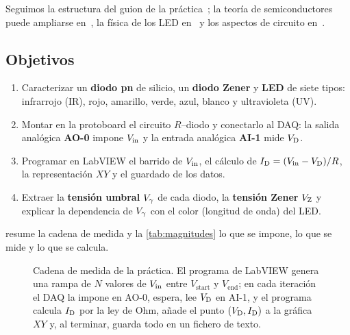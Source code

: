 \documentclass[11pt,a4paper]{article}
\begin{document}
Seguimos la estructura del guion de la práctica~\cite{guion}; la teoría de
semiconductores puede ampliarse en~\cite{sze,pierret}, la física de los LED
en~\cite{schubert} y los aspectos de circuito en~\cite{horowitz,sedra}.

\subsection{Objetivos}

\begin{enumerate}
  \item Caracterizar un \textbf{diodo pn} de silicio, un \textbf{diodo Zener}
        y \textbf{LED} de siete tipos: infrarrojo (IR), rojo, amarillo,
        verde, azul, blanco y ultravioleta (UV).
  \item Montar en la protoboard el circuito $R$--diodo y conectarlo al DAQ:
        la salida analógica \textbf{AO-0} impone $V_{\mathrm{in}}$ y la entrada
        analógica \textbf{AI-1} mide $V_{\mathrm D}$.
  \item Programar en LabVIEW el barrido de $V_{\mathrm{in}}$, el cálculo de
        $I_{\mathrm D}=(V_{\mathrm{in}}-V_{\mathrm D})/R$, la representación $XY$ y el guardado de los datos.
  \item Extraer la \textbf{tensión umbral} $V_{\gamma}$ de cada diodo, la
        \textbf{tensión Zener} $V_{\mathrm Z}$ y explicar la dependencia de $V_{\gamma}$ con
        el color (longitud de onda) del LED.
\end{enumerate}

 resume la cadena de medida y la
\cref{tab:magnitudes} lo que se impone, lo que se mide y lo que se calcula.

\begin{figure}[htbp]
  \centering
  
  \caption{Cadena de medida de la práctica. El programa de LabVIEW genera una
  rampa de $N$ valores de $V_{\mathrm{in}}$ entre $V_{\text{start}}$ y $V_{\text{end}}$; en
  cada iteración el DAQ la impone en AO-0, espera, lee $V_{\mathrm D}$ en AI-1, y el
  programa calcula $I_{\mathrm D}$ por la ley de Ohm, añade el punto $(V_{\mathrm D},I_{\mathrm D})$ a la
  gráfica $XY$ y, al terminar, guarda todo en un fichero de texto.}
  \label{fig:esquema-general}
\end{figure}
\end{document}
